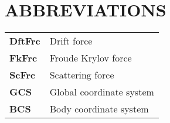 \chapter*{\centering ABBREVIATIONS}
\vspace{0.5cm}
\begin{table}[h]
\centering
\setlength{\tabcolsep}{12pt}
\renewcommand{\arraystretch}{1.5} %
\begin{tabular}{ll}
    {\bf DftFrc} & Drift force \\
    {\bf FkFrc} & Froude Krylov force \\
    {\bf ScFrc} & Scattering force \\
    {\bf GCS} & Global coordinate system \\
    {\bf BCS} & Body coordinate system
\end{tabular}
\end{table}